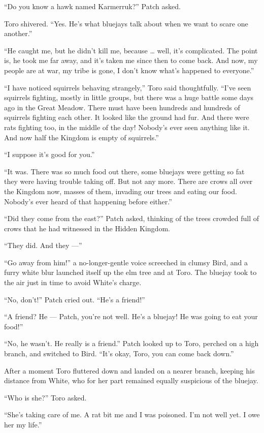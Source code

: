 \documentclass[12pt]{memoir}
\begin{document}
“Do you know a hawk named Karmerruk?” Patch asked.

Toro shivered. “Yes. He’s what bluejays talk about when we want to
scare one another.”

“He caught me, but he didn’t kill me, because … well, it’s
complicated. The point is, he took me far away, and it’s taken me
since then to come back. And now, my people are at war, my tribe is
gone, I don’t know what’s happened to everyone.”

“I have noticed squirrels behaving strangely,” Toro said
thoughtfully. “I’ve seen squirrels fighting, mostly in little groups,
but there was a huge battle some days ago in the Great Meadow. There
must have been hundreds and hundreds of squirrels fighting each
other. It looked like the ground had fur. And there were rats fighting
too, in the middle of the day! Nobody’s ever seen anything like
it. And now half the Kingdom is empty of squirrels.”

“I suppose it’s good for you.”

“It was. There was so much food out there, some bluejays were getting
so fat they were having trouble taking off. But not any more. There
are crows all over the Kingdom now, masses of them, invading our trees
and eating our food. Nobody’s ever heard of that happening before
either.”

“Did they come from the east?” Patch asked, thinking of the trees
crowded full of crows that he had witnessed in the Hidden Kingdom.

“They did. And they —”

“Go away from him!” a no-longer-gentle voice screeched in clumsy Bird,
and a furry white blur launched itself up the elm tree and at
Toro. The bluejay took to the air just in time to avoid White’s
charge.

“No, don’t!” Patch cried out. “He’s a friend!”

“A friend? He — Patch, you’re not well. He’s a bluejay! He was going
to eat your food!”

“No, he wasn’t. He really is a friend.” Patch looked up to Toro,
perched on a high branch, and switched to Bird. “It’s okay, Toro, you
can come back down.”

After a moment Toro fluttered down and landed on a nearer branch,
keeping his distance from White, who for her part remained equally
suspicious of the bluejay.

“Who is she?” Toro asked.

“She’s taking care of me. A rat bit me and I was poisoned. I’m not
well yet. I owe her my life.”
\end{document}

